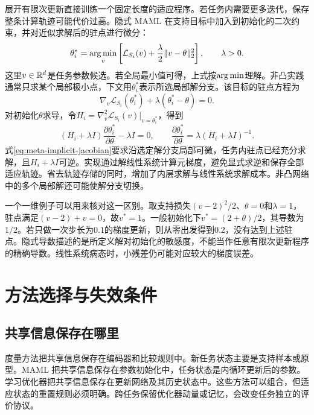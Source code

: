 展开有限次更新直接训练一个固定长度的适应程序。若任务内需要更多迭代，保存整条计算轨迹可能代价过高。隐式 MAML 在支持目标中加入到初始化的二次约束，并对近似求解后的驻点进行微分\cite{rajeswaran2019imaml}：
\begin{equation}
\theta_i^*=\mathop{\mathrm{arg\,min}}_v\left[\mathcal L_{S_i}(v)+\frac\lambda2\|v-\theta\|_2^2\right],\qquad \lambda>0.
\end{equation}
这里$v\in\mathbb{R}^d$是任务参数候选。若全局最小值可得，上式按$\mathop{\mathrm{arg\,min}}$理解。非凸实践通常只求某个局部极小点，下文用$\theta_i^*$表示所选局部解分支。该目标的驻点方程为
\begin{equation}
\nabla_v\mathcal L_{S_i}(\theta_i^*)+\lambda(\theta_i^*-\theta)=0.
\end{equation}
对初始化$\theta$求导，令$H_i=\nabla_v^2\mathcal L_{S_i}(v)|_{v=\theta_i^*}$，得到
\begin{equation}
(H_i+\lambda I)\frac{\partial\theta_i^*}{\partial\theta}-\lambda I=0,
\qquad
\frac{\partial\theta_i^*}{\partial\theta}=\lambda(H_i+\lambda I)^{-1}.
\label{eq:meta-implicit-jacobian}
\end{equation}
式\eqref{eq:meta-implicit-jacobian}要求沿选定解分支局部可微，任务内驻点已经充分求解，且$H_i+\lambda I$可逆。实现通过解线性系统计算元梯度，避免显式求逆和保存全部适应轨迹。省去轨迹存储的同时，增加了内层求解与线性系统求解成本。非凸网络中的多个局部解还可能使解分支切换。

一个一维例子可以用来核对这一区别。取支持损失$(v-2)^2/2$、$\theta=0$和$\lambda=1$，驻点满足$(v-2)+v=0$，故$v^*=1$。一般初始化下$v^*=(2+\theta)/2$，其导数为$1/2$。若只做一次步长为$0.1$的梯度更新，则从零出发得到$0.2$，没有达到上述驻点。隐式导数描述的是所定义解对初始化的敏感度，不能当作任意有限次更新程序的精确导数。线性系统病态时，小残差仍可能对应较大的梯度误差。

\section{方法选择与失效条件}

\subsection{共享信息保存在哪里}

度量方法把共享信息保存在编码器和比较规则中。新任务状态主要是支持样本或原型。MAML 把共享信息保存在参数初始化中，任务状态是内循环更新后的参数。学习优化器把共享信息保存在更新网络及其历史状态中\cite{andrychowicz2016optimizer}。这些方法可以组合，但适应状态的重置规则必须明确。跨任务保留优化器动量或记忆，会改变任务独立的评价协议。

